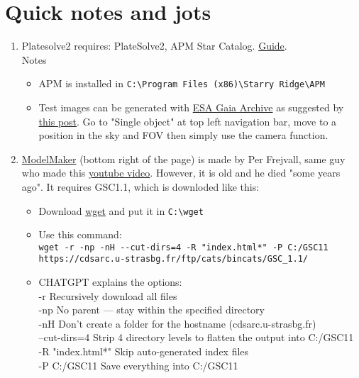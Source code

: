\documentclass[../main.tex]{subfiles}
\begin{document}
\section{Quick notes and jots}
\begin{enumerate}
    \item Platesolve2 requires: PlateSolve2, APM Star Catalog. \href{https://astroguide.starlust.de/html/PlateSolve2.html}{Guide}.
    \\ Notes
    \begin{itemize}
        \item APM is installed in \verb|C:\Program Files (x86)\Starry Ridge\APM|
        \item Test images can be generated with \href{https://gea.esac.esa.int/archive/}{ESA Gaia Archive} as suggested by \href{https://www.cloudynights.com/topic/886389-here-is-a-useful-tool-to-obtain-known-good-test-images-for-plate-solving/}{this post}. Go to "Single object" at top left navigation bar, move to a position in the sky and FOV then simply use the camera function.
    \end{itemize}
    \item \href{https://10micron.eu/en/downloads/modelcreator}{ModelMaker} (bottom right of the page) is made by Per Frejvall, same guy who made this \href{https://www.youtube.com/watch?v=WfkQnZTFXzo}{youtube video}. However, it is old and he died "some years ago". It requires GSC1.1, which is downloded like this:
    \begin{itemize}
        \item Download \href{https://eternallybored.org/misc/wget/}{wget} and put it in \verb|C:\wget|
        \item Use this command:\\ \verb|wget -r -np -nH --cut-dirs=4 -R "index.html*" -P C:/GSC11 https://cdsarc.u-strasbg.fr/ftp/cats/bincats/GSC_1.1/|
        \item CHATGPT explains the options: \\
        -r	Recursively download all files\\
        -np	No parent — stay within the specified directory\\
        -nH	Don't create a folder for the hostname (cdsarc.u-strasbg.fr)\\
        --cut-dirs=4	Strip 4 directory levels to flatten the output into C:/GSC11\\
        -R "index.html*"	Skip auto-generated index files\\
        -P C:/GSC11	Save everything into C:/GSC11\\

\end{itemize}
\end{enumerate}
\end{document}

